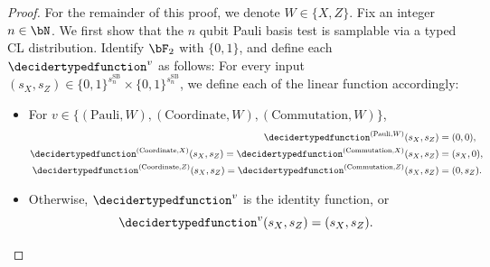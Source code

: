 \begin{proof}
	For the remainder of this proof, we denote $W \in \{X,Z\}$.	Fix an integer $n\in \bN$. We first show that the $n$ qubit Pauli basis test is samplable via a typed CL distribution. Identify $\bF_2$ with $\{0,1\}$, and define each $\decidertypedfunction^v$ as follows: For every input $(s_{X}, s_{Z}) \in \{0,1\}^{s^{\text{SB}}_n} \times \{0,1\}^{s^{\text{SB}}_n}$, we define each of the linear function accordingly:
	\begin{itemize}
		\item  For $v \in \{ (\text{Pauli}, W), (\text{Coordinate}, W), (\text{Commutation}, W)\}$, 
		\begin{align*}
			\decidertypedfunction^{(\text{Pauli}, W)}(s_{X}, s_{Z}) &=  (0,0), \\
			\decidertypedfunction^{ (\text{Coordinate}, X)}(s_{X}, s_{Z}) = \decidertypedfunction^{ (\text{Commutation}, X)}(s_{X}, s_{Z}) &= (s_{X}, 0), \\
			\decidertypedfunction^{ (\text{Coordinate}, Z)}(s_{X}, s_{Z})  =\decidertypedfunction^{ (\text{Commutation}, Z)}(s_{X}, s_{Z}) &= (0, s_{Z}).
		\end{align*}
		\item Otherwise, $\decidertypedfunction^{v}$ is the identity function, or 
		\begin{equation*}
			\decidertypedfunction^{v}(s_{X}, s_{Z}) =  (s_{X}, s_{Z}). 
		\end{equation*}
	\end{itemize}
	

\end{proof}
